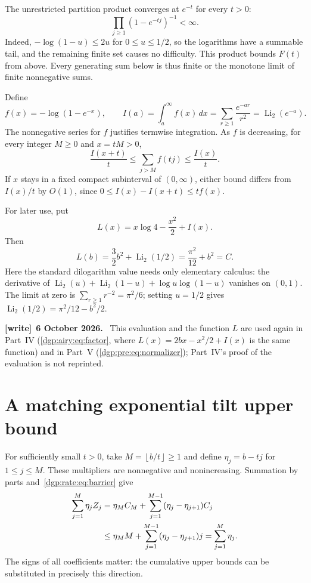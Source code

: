 \documentclass[11pt,letterpaper]{article}
\numberwithin{equation}{section}
\theoremstyle{remark}\newtheorem{remark}[theorem]{Remark}
\newcommand{\floor}[1]{\left\lfloor #1\right\rfloor}
\DeclareMathOperator{\Li}{Li}
\newenvironment{writenote}[1][]{\par\smallskip\begingroup\small
 \noindent\textbf{[write]}\if\relax\detokenize{#1}\relax\else~\textbf{#1.}\fi\ }%
 {\par\endgroup\smallskip}
\begin{document}
The unrestricted partition product converges at $e^{-t}$ for every $t>0$:
\[
 \prod_{j\geq1}(1-e^{-tj})^{-1}<\infty.
\]
Indeed, $-\log(1-u)\leq2u$ for $0\leq u\leq1/2$, so the logarithms
have a summable tail, and the remaining finite set causes no difficulty.
This product bounds $F(t)$ from above. Every generating sum below is thus
finite or the monotone limit of finite nonnegative sums.

Define
\begin{equation}\label{dgp:rate:eq:fI}
 f(x)=-\log(1-e^{-x}),\qquad
 I(a)=\int_a^\infty f(x)\,dx
     =\sum_{r\geq1}\frac{e^{-ar}}{r^2}=\Li_2(e^{-a}).
\end{equation}
The nonnegative series for $f$ justifies termwise integration. As $f$ is
decreasing, for every integer $M\geq0$ and $x=tM>0$,
\begin{equation}\label{dgp:rate:eq:riemann}
 \frac{I(x+t)}t\leq\sum_{j>M}f(tj)\leq\frac{I(x)}t.
\end{equation}
If $x$ stays in a fixed compact subinterval of $(0,\infty)$, either bound
differs from $I(x)/t$ by $O(1)$, since
$0\leq I(x)-I(x+t)\leq t f(x)$.

For later use, put
\begin{equation}\label{dgp:rate:eq:L}
 L(x)=x\log4-\frac{x^2}{2}+I(x).
\end{equation}
Then
\begin{equation}\label{dgp:rate:eq:Lb}
 L(b)=\frac32b^2+\Li_2(1/2)
     =\frac{\pi^2}{12}+b^2=C.
\end{equation}
Here the standard dilogarithm value needs only elementary calculus:
the derivative of
$\Li_2(u)+\Li_2(1-u)+\log u\log(1-u)$ vanishes on $(0,1)$.
The limit at zero is $\sum_{r\geq1}r^{-2}=\pi^2/6$; setting $u=1/2$
gives $\Li_2(1/2)=\pi^2/12-b^2/2$.
\begin{writenote}[6 October 2026]
This evaluation and the function $L$ are used again in Part~IV (\eqref{dgp:airy:eq:factor}, where $L(x)=2bx-x^2/2+I(x)$ is the same function) and in Part~V (\eqref{dgp:pre:eq:normalizer}); Part~IV's proof of the evaluation is not reprinted.
\end{writenote}

\section{A matching exponential tilt upper bound}\label{dgp:rate:sec:upper}
For sufficiently small $t>0$, take $M=\floor{b/t}\geq1$ and define
$\eta_j=b-tj$ for $1\leq j\leq M$. These multipliers are nonnegative
and nonincreasing. Summation by parts and~\eqref{dgp:rate:eq:barrier} give
\begin{align}
 \sum_{j=1}^M\eta_jZ_j
 &=\eta_MC_M+\sum_{j=1}^{M-1}(\eta_j-\eta_{j+1})C_j\notag\\
 &\leq\eta_MM+\sum_{j=1}^{M-1}(\eta_j-\eta_{j+1})j
   =\sum_{j=1}^M\eta_j.\label{dgp:rate:eq:tiltbarrier}
\end{align}
The signs of all coefficients matter: the cumulative upper bounds can be
substituted in precisely this direction.
\end{document}
